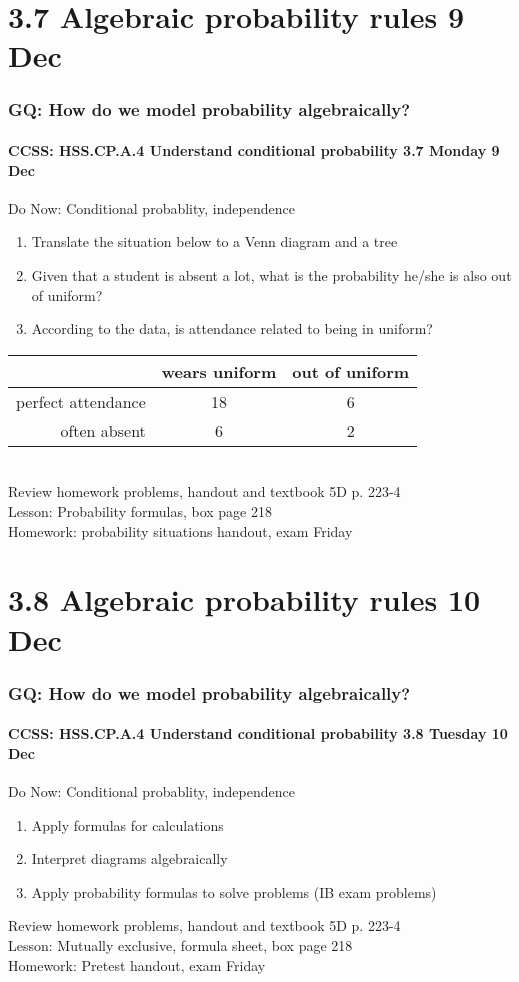 \documentclass{beamer}
\begin{document}
\section{3.7 Algebraic probability rules 9 Dec}
\frame
{
  \frametitle{GQ: How do we model probability algebraically?}
  \framesubtitle{CCSS: HSS.CP.A.4 Understand conditional probability \hfill \alert{3.7 Monday 9 Dec}}

  \begin{block}{Do Now: Conditional probablity, independence}
  \begin{enumerate}
    \item Translate the situation below to a Venn diagram and a tree
    \item Given that a student is absent a lot, what is the probability he/she is also out of uniform?
    \item According to the data, is attendance related to being in uniform?
  \end{enumerate}
  \end{block}
  \begin{tabular}{r|c|c|}
    & wears uniform & out of uniform\\
    \hline
    perfect attendance & 18 & 6\\
    \hline
    often absent & 6 & 2\\
    \hline
  \end{tabular}\\[0.5cm]
  Review homework problems, handout and textbook 5D p. 223-4 \\
  Lesson: Probability formulas, box page 218 \\ \smallskip
  Homework: probability situations handout, \alert{exam Friday}
}

\section{3.8 Algebraic probability rules 10 Dec}
\frame
{
  \frametitle{GQ: How do we model probability algebraically?}
  \framesubtitle{CCSS: HSS.CP.A.4 Understand conditional probability \hfill \alert{3.8 Tuesday 10 Dec}}

  \begin{block}{Do Now: Conditional probablity, independence}
  \begin{enumerate}
    \item Apply formulas for calculations
    \item Interpret diagrams algebraically
    \item Apply probability formulas to solve problems (IB exam problems)
  \end{enumerate}
  \end{block}
  Review homework problems, handout and textbook 5D p. 223-4 \\
  Lesson: Mutually exclusive, formula sheet, box page 218 \\ \smallskip
  Homework: Pretest handout, \alert{exam Friday}
}
\end{document}
